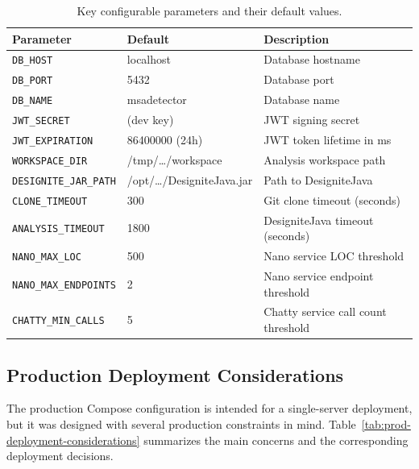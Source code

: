 \begin{table}[htbp]
    \centering
    \footnotesize
    \begin{tabular}{|l|l|p{4.5cm}|}
        \hline
        \textbf{Parameter} & \textbf{Default} & \textbf{Description} \\
        \hline\hline
        \texttt{DB\_HOST} & localhost & Database hostname \\
        \hline
        \texttt{DB\_PORT} & 5432 & Database port \\
        \hline
        \texttt{DB\_NAME} & msadetector & Database name \\
        \hline
        \texttt{JWT\_SECRET} & (dev key) & JWT signing secret \\
        \hline
        \texttt{JWT\_EXPIRATION} & 86400000 (24h) & JWT token lifetime in ms \\
        \hline
        \texttt{WORKSPACE\_DIR} & /tmp/\ldots/workspace & Analysis workspace path \\
        \hline
        \texttt{DESIGNITE\_JAR\_PATH} & /opt/\ldots/DesigniteJava.jar & Path to DesigniteJava \\
        \hline
        \texttt{CLONE\_TIMEOUT} & 300 & Git clone timeout (seconds) \\
        \hline
        \texttt{ANALYSIS\_TIMEOUT} & 1800 & DesigniteJava timeout (seconds) \\
        \hline
        \texttt{NANO\_MAX\_LOC} & 500 & Nano service LOC threshold \\
        \hline
        \texttt{NANO\_MAX\_ENDPOINTS} & 2 & Nano service endpoint threshold \\
        \hline
        \texttt{CHATTY\_MIN\_CALLS} & 5 & Chatty service call count threshold \\
        \hline
    \end{tabular}
    \caption{Key configurable parameters and their default values.}
    \label{tab:config-params}
\end{table}

\subsection{Production Deployment Considerations}
\label{subsec:prod-deployment}

\par The production Compose configuration is intended for a single-server deployment, but it was designed with several production constraints in mind. Table~\ref{tab:prod-deployment-considerations} summarizes the main concerns and the corresponding deployment decisions.

